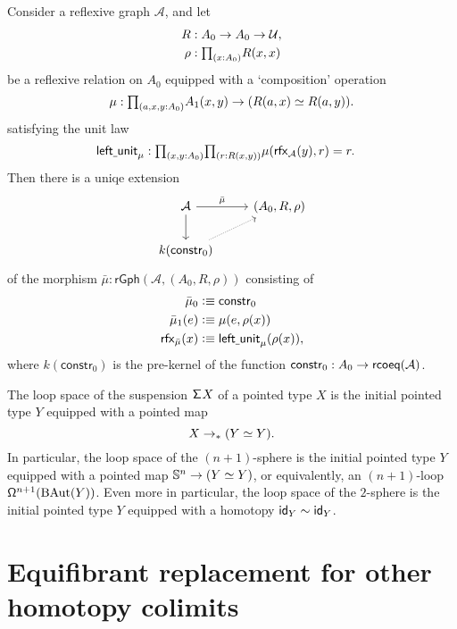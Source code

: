 \begin{thm}
Consider a reflexive graph $\mathcal{A}$, and let
\begin{align*}
R & : A_0 \to A_0 \to\UU, \\
\rho & : \prd{x:A_0}R(x,x)
\end{align*}
be a reflexive relation on $A_0$ equipped with a `composition' operation
\begin{equation*}
\mu:\prd{a,x,y:\pts{A}} \edg{A}(x,y) \to (\eqv{R(a,x)}{R(a,y)}).
\end{equation*}
satisfying the unit law
\begin{align*}
\mathsf{left\usc{}unit}_\mu & : \prd{x,y:\pts{A}}{r:R(x,y)} \mu(\rfx{\mathcal{A}}(y),r)=r.
\end{align*}
Then there is a uniqe extension
\begin{equation*}
\begin{tikzcd}
\mathcal{A} \arrow[r,"\bar{\mu}"] \arrow[d] & (A_0,R,\rho) \\
k(\mathsf{constr}_0) \arrow[ur,densely dotted]
\end{tikzcd}
\end{equation*}
of the morphism $\bar{\mu}:\mathsf{rGph}(\mathcal{A},(A_0,R,\rho))$ consisting of
\begin{align*}
\pts{\bar{\mu}} & \defeq \mathsf{constr}_0 \\
\edg{\bar{\mu}}(e) & \defeq \mu(e,\rho(x)) \\
\rfx{\bar{\mu}}(x) & \defeq \mathsf{left\usc{}unit}_\mu(\rho(x)),
\end{align*}
where $k(\mathsf{constr}_0)$ is the pre-kernel of the function $\mathsf{constr}_0:A_0\to\rcoeq(\mathcal{A})$.
\end{thm}

\begin{cor}
The loop space of the suspension $\susp X$ of a pointed type $X$ is the initial pointed type $Y$ equipped with a pointed map 
\begin{equation*}
X\to_\ast (\eqv{Y}{Y}).
\end{equation*}
In particular, the loop space of the $(n+1)$-sphere is the initial pointed type $Y$ equipped with a pointed map $\sphere{n}\to (\eqv{Y}{Y})$, or equivalently, an $(n+1)$-loop $\loopspace[n+1]{\mathrm{BAut}(Y)}$. Even more in particular, the loop space of the $2$-sphere is the initial pointed type $Y$ equipped with a homotopy $\idfunc[Y]\htpy\idfunc[Y]$. 
\end{cor}

\section{Equifibrant replacement for other homotopy colimits}

